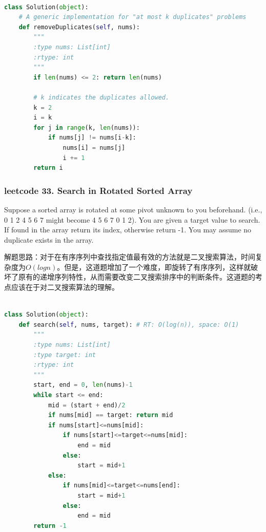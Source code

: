 \documentclass[a4paper,10pt]{article}
\begin{document}
\begin{lstlisting}[language=Python, caption=Problem80. Remove Duplicates from Sorted Array II]

class Solution(object):
    # A generic implementation for "at most k duplicates" problems
    def removeDuplicates(self, nums):  
        """
        :type nums: List[int]
        :rtype: int
        """
        if len(nums) <= 2: return len(nums)
        
        # k indicates the duplicates allowed.
        k = 2
        i = k
        for j in range(k, len(nums)):
            if nums[j] != nums[i-k]:
                nums[i] = nums[j]
                i += 1
        return i
\end{lstlisting}




\subsubsection{leetcode 33. Search in Rotated Sorted Array}
Suppose a sorted array is rotated at some pivot unknown to you beforehand. (i.e., 0 1 2 4 5 6 7 might become 4 5 6 7 0 1 2). You are given a target value to search. If found in the array return its index, otherwise return -1. You may assume no duplicate exists in the array.\\

\begin{CJK*}{UTF8}{gbsn}
\noindent 解题思路：对于在有序序列中查找指定值最有效的方法就是二叉搜索算法，时间复杂度为$O(logn)$。但是，这道题增加了一个难度，即旋转了有序序列，这样就破坏了原有的递增序列特性，从而需要改变二叉搜索排序中的判断条件。这道题的考点应该在于对二叉搜索算法的理解。\\
\end{CJK*}


\begin{lstlisting}[language=Python, caption=Problem33. Search in Rotated Sorted Array]

class Solution(object):
    def search(self, nums, target): # RT: O(log(n)), space: O(1)
        """
        :type nums: List[int]
        :type target: int
        :rtype: int
        """
        start, end = 0, len(nums)-1
        while start <= end:
            mid = (start + end)/2
            if nums[mid] == target: return mid
            if nums[start]<=nums[mid]:
                if nums[start]<=target<=nums[mid]:
                    end = mid
                else:
                    start = mid+1
            else:
                if nums[mid]<=target<=nums[end]:
                    start = mid+1
                else:
                    end = mid
        return -1
\end{lstlisting}
\end{document}

